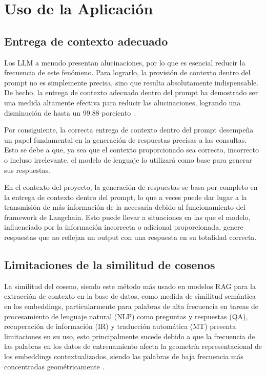 \section{Uso de la Aplicación}

\subsection{Entrega de contexto adecuado}

Los LLM a menudo presentan alucinaciones, por lo que es esencial reducir la frecuencia de este fenómeno. 
Para lograrlo, la provisión de contexto dentro del prompt no es simplemente precisa, sino que resulta 
absolutamente indispensable. De hecho, la entrega de contexto adecuado dentro del prompt ha demostrado 
ser una medida altamente efectiva para reducir las alucinaciones, logrando una disminución de hasta un 
99.88 porciento \cite{riego1}.

Por consiguiente, la correcta entrega de contexto dentro del prompt desempeña un papel fundamental en 
la generación de respuestas precisas a las consultas. Esto se debe a que, ya sea que el contexto 
proporcionado sea correcto, incorrecto o incluso irrelevante, el modelo de lenguaje lo utilizará como base 
para generar sus respuestas.

En el contexto del proyecto, la generación de respuestas se basa por completo en la entrega de contexto 
dentro del prompt, lo que a veces puede dar lugar a la transmisión de más información de la necesaria 
debido al funcionamiento del framework de Langchain. Esto puede llevar a situaciones en las que el modelo, 
influenciado por la información incorrecta o adicional proporcionada, genere respuestas que no reflejan 
un output con una respuesta en su totalidad correcta.

\subsection{Limitaciones de la similitud de cosenos}

La similitud del coseno, siendo este método más usado en modelos RAG para la extracción de contexto en la base de datos, 
como medida de similitud semántica en los embeddings, particularmente para palabras de alta frecuencia en tareas de 
procesamiento de lenguaje natural (NLP) como preguntas y respuestas (QA), recuperación de información (IR) y traducción 
automática (MT) presenta limitaciones en su uso, esto principalmente sucede debido a que la frecuencia de las palabras en los 
datos de entrenamiento afecta la geometría representacional de los embeddings contextualizados, siendo las palabras de baja 
frecuencia más concentradas geométricamente \cite{coseno}.

